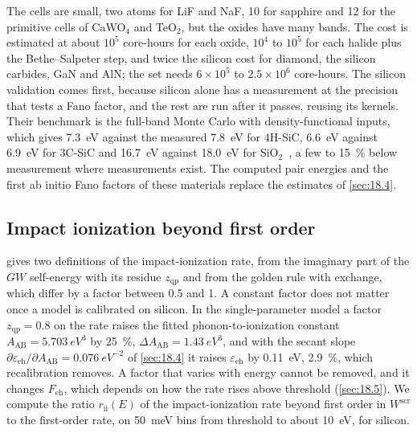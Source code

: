 The cells are small, two atoms for LiF and NaF, 10 for sapphire and 12 for the primitive cells of CaWO$_4$ and TeO$_2$, but the oxides have many bands. The cost is estimated at about $10^5$ core-hours for each oxide, $10^4$ to $10^5$ for each halide plus the Bethe--Salpeter step, and twice the silicon cost for diamond, the silicon carbides, GaN and AlN; the set needs $6\times10^5$ to $2.5\times10^6$ core-hours. The silicon validation comes first, because silicon alone has a measurement at the precision that tests a Fano factor, and the rest are run after it passes, reusing its kernels. Their benchmark is the full-band Monte Carlo with density-functional inputs, which gives \SI{7.3}{eV} against the measured \SI{7.8}{eV} for 4H-SiC, \SI{6.6}{eV} against \SI{6.9}{eV} for 3C-SiC and \SI{16.7}{eV} against \SI{18.0}{eV} for SiO$_2$~\cite[Table~II]{nielsen2026first}, a few to \SI{15}{\percent} below measurement where measurements exist. The computed pair energies and the first ab initio Fano factors of these materials replace the estimates of \cref{sec:18.4}.

\subsection{Impact ionization beyond first order}

 gives two definitions of the impact-ionization rate, from the imaginary part of the $GW$ self-energy with its residue $z_{\mathrm{qp}}$ and from the golden rule with exchange, which differ by a factor between 0.5 and 1. A constant factor does not matter once a model is calibrated on silicon. In the single-parameter model a factor $z_{\mathrm{qp}} = 0.8$ on the rate raises the fitted phonon-to-ionization constant $A_{\mathrm{AB}} = \SI{5.703}{eV^3}$ by \SI{25}{\percent}, $\Delta A_{\mathrm{AB}} = \SI{1.43}{eV^3}$, and with the secant slope $\partial\varepsilon_{\mathrm{eh}}/\partial A_{\mathrm{AB}} = \SI{0.076}{eV^{-2}}$ of \cref{sec:18.4} it raises $\varepsilon_{\mathrm{eh}}$ by \SI{0.11}{eV}, \SI{2.9}{\percent}, which recalibration removes. A factor that varies with energy cannot be removed, and it changes $F_{\mathrm{eh}}$, which depends on how the rate rises above threshold (\cref{sec:18.5}). We compute the ratio $r_{\mathrm{ii}}(E)$ of the impact-ionization rate beyond first order in $W^{\mathrm{scr}}$ to the first-order rate, on \SI{50}{meV} bins from threshold to about \SI{10}{eV}, for silicon.


